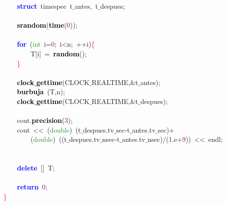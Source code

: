 \mbox{}\ \ \ \ \textbf{\textcolor{Blue}{struct}}\ \textcolor{TealBlue}{timespec}\ t$\_$antes\textcolor{BrickRed}{,}\ t$\_$despues\textcolor{BrickRed}{;} \\
\mbox{}\ \ \ \  \\
\mbox{}\ \ \ \ \textbf{\textcolor{Black}{srandom}}\textcolor{BrickRed}{(}\textbf{\textcolor{Black}{time}}\textcolor{BrickRed}{(}\textcolor{Purple}{0}\textcolor{BrickRed}{));} \\
\mbox{}\ \ \ \  \\
\mbox{}\ \ \ \ \textbf{\textcolor{Blue}{for}}\ \textcolor{BrickRed}{(}\textcolor{ForestGreen}{int}\ i\textcolor{BrickRed}{=}\textcolor{Purple}{0}\textcolor{BrickRed}{;}\ i\textcolor{BrickRed}{\textless{}}n\textcolor{BrickRed}{;}\ \textcolor{BrickRed}{++}i\textcolor{BrickRed}{)}\textcolor{Red}{\{} \\
\mbox{}\ \ \ \ \ \ \ \ T\textcolor{BrickRed}{[}i\textcolor{BrickRed}{]}\ \textcolor{BrickRed}{=}\ \textbf{\textcolor{Black}{random}}\textcolor{BrickRed}{();} \\
\mbox{}\ \ \ \ \textcolor{Red}{\}} \\
\mbox{}\ \ \ \  \\
\mbox{}\ \ \ \ \textbf{\textcolor{Black}{clock$\_$gettime}}\textcolor{BrickRed}{(}CLOCK$\_$REALTIME\textcolor{BrickRed}{,\&}t$\_$antes\textcolor{BrickRed}{);} \\
\mbox{}\ \ \ \ \textbf{\textcolor{Black}{burbuja}}\ \textcolor{BrickRed}{(}T\textcolor{BrickRed}{,}n\textcolor{BrickRed}{);} \\
\mbox{}\ \ \ \ \textbf{\textcolor{Black}{clock$\_$gettime}}\textcolor{BrickRed}{(}CLOCK$\_$REALTIME\textcolor{BrickRed}{,\&}t$\_$despues\textcolor{BrickRed}{);} \\
\mbox{}\ \ \ \  \\
\mbox{}\ \ \ \ cout\textcolor{BrickRed}{.}\textbf{\textcolor{Black}{precision}}\textcolor{BrickRed}{(}\textcolor{Purple}{3}\textcolor{BrickRed}{);} \\
\mbox{}\ \ \ \ cout\ \textcolor{BrickRed}{\textless{}\textless{}}\ \textcolor{BrickRed}{(}\textcolor{ForestGreen}{double}\textcolor{BrickRed}{)}\ \textcolor{BrickRed}{(}t$\_$despues\textcolor{BrickRed}{.}tv$\_$sec\textcolor{BrickRed}{-}t$\_$antes\textcolor{BrickRed}{.}tv$\_$sec\textcolor{BrickRed}{)+} \\
\mbox{}\ \ \ \ \ \ \ \ \textcolor{BrickRed}{(}\textcolor{ForestGreen}{double}\textcolor{BrickRed}{)}\ \textcolor{BrickRed}{((}t$\_$despues\textcolor{BrickRed}{.}tv$\_$nsec\textcolor{BrickRed}{-}t$\_$antes\textcolor{BrickRed}{.}tv$\_$nsec\textcolor{BrickRed}{)/(}\textcolor{Purple}{1}\textcolor{BrickRed}{.}e\textcolor{BrickRed}{+}\textcolor{Purple}{9}\textcolor{BrickRed}{))}\ \textcolor{BrickRed}{\textless{}\textless{}}\ endl\textcolor{BrickRed}{;} \\
\mbox{} \\
\mbox{}\ \ \ \  \\
\mbox{}\ \ \ \ \textbf{\textcolor{Blue}{delete}}\ \textcolor{BrickRed}{[]}\ T\textcolor{BrickRed}{;} \\
\mbox{}\ \ \ \  \\
\mbox{}\ \ \ \ \textbf{\textcolor{Blue}{return}}\ \textcolor{Purple}{0}\textcolor{BrickRed}{;} \\
\mbox{}\textcolor{Red}{\}}
